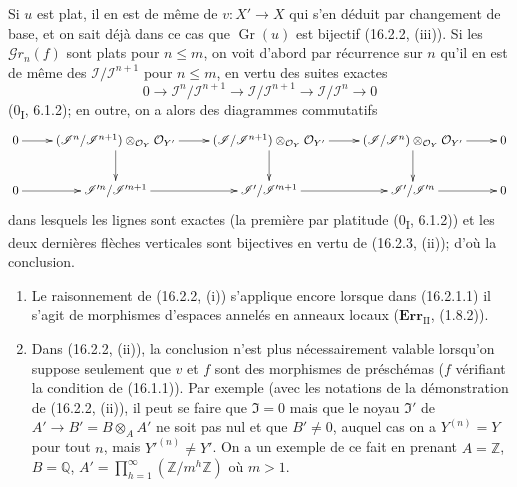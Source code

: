 Si $u$ est plat, il en est de même de $v:X'\to X$ qui s'en déduit par
changement de base, et on sait déjà dans ce cas que $\operatorname{Gr}(u)$ est
bijectif (16.2.2, (iii)). Si les $\mathscr{G}r_n(f)$ sont plats pour
$n\leq m$, on voit d'abord par récurrence sur $n$ qu'il en est de même des
$\mathscr{I}/\mathscr{I}^{n+1}$ pour $n\leq m$, en vertu des suites exactes
\[
  0\longrightarrow\mathscr{I}^n/\mathscr{I}^{n+1}
  \longrightarrow\mathscr{I}/\mathscr{I}^{n+1}
  \longrightarrow\mathscr{I}/\mathscr{I}^n
  \longrightarrow 0
\]
(0\textsubscript{I}, 6.1.2); en outre, on a alors des diagrammes commutatifs
\[
  \xymatrix{
    0 \ar[r] &
    (\mathscr{I}^n/\mathscr{I}^{n+1})
      \otimes_{\mathcal{O}_Y}\mathcal{O}_{Y'}
      \ar[r]\ar[d] &
    (\mathscr{I}/\mathscr{I}^{n+1})
      \otimes_{\mathcal{O}_Y}\mathcal{O}_{Y'}
      \ar[r]\ar[d] &
    (\mathscr{I}/\mathscr{I}^n)
      \otimes_{\mathcal{O}_Y}\mathcal{O}_{Y'}
      \ar[r]\ar[d] & 0 \\
    0 \ar[r] &
    \mathscr{I}'^n/\mathscr{I}'^{n+1}
      \ar[r] &
    \mathscr{I}'/\mathscr{I}'^{n+1}
      \ar[r] &
    \mathscr{I}'/\mathscr{I}'^n
      \ar[r] & 0
  }
\]
dans lesquels les lignes sont exactes (la première par platitude
(0\textsubscript{I}, 6.1.2)) et les deux dernières flèches verticales sont
bijectives en vertu de (16.2.3, (ii)); d'où la conclusion.

\begin{remarks}[16.2.5]
\label{IV.16.2.5}
\begin{enumerate}
\item[(i)] Le raisonnement de (16.2.2, (i)) s'applique encore lorsque dans
(16.2.1.1) il s'agit de morphismes d'espaces annelés en anneaux locaux
($\mathbf{Err}_{\mathrm{II}}$, (1.8.2)).
\item[(ii)] Dans (16.2.2, (ii)), la conclusion n'est plus nécessairement valable
lorsqu'on suppose seulement que $v$ et $f$ sont des morphismes de préschémas
($f$ vérifiant la condition de (16.1.1)). Par exemple (avec les notations de la
démonstration de (16.2.2, (ii)), il peut se faire que $\mathfrak{I}=0$ mais que
le noyau $\mathfrak{I}'$ de $A'\to B'=B\otimes_A A'$ ne soit pas nul et que
$B'\neq 0$, auquel cas on a $Y^{(n)}=Y$ pour tout $n$, mais
$Y'^{(n)}\neq Y'$. On a un exemple de ce fait en prenant
$A=\mathbb{Z}$, $B=\mathbb{Q}$,
$A'=\prod_{h=1}^{\infty}(\mathbb{Z}/m^h\mathbb{Z})$ où $m>1$.
\end{enumerate}
\end{remarks}

